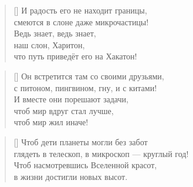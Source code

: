 \documentclass[a5paper,11pt]{memoir}
\begin{document}
\newpage


\BgThispage



\begin{verse}[\versewidth]
И радость его не находит границы,\\
смеются в слоне даже микрочастицы!\\
Ведь знает, ведь знает,\\
наш слон, Харитон,\\
что путь приведёт его на Хакатон!
\end{verse}



\begin{verse}[\versewidth]
Он встретится там со своими друзьями,\\
с питоном, пингвином, гну, и с китами!\\
И вместе они порешают задачи,\\
чтоб мир вдруг стал лучше,\\
чтоб мир жил иначе!
\end{verse}


\begin{verse}[\versewidth]
Чтоб дети планеты могли без забот\\
глядеть в телескоп, в микроскоп --- круглый год!\\
Чтоб насмотревшись Вселенной красот,\\
в жизни достигли новых высот.
\end{verse}

\newpage
\hfill
{}
\BgThispage

\newpage

\renewcommand{\thefigure}{\arabic{figure}}
\end{document}

